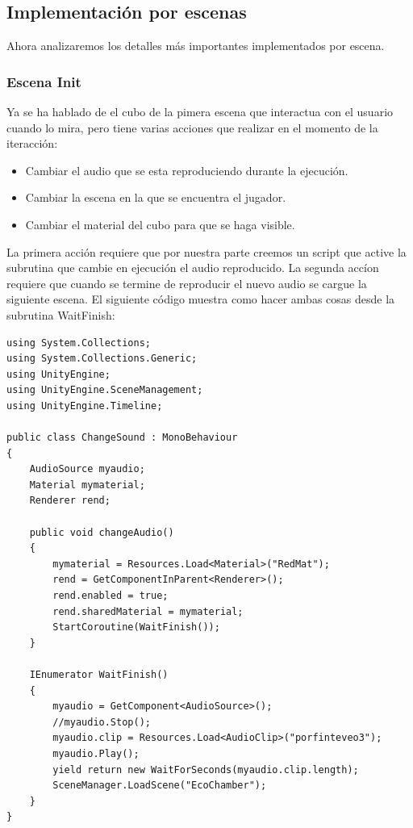 \subsection{Implementación por escenas}

\quad Ahora analizaremos los detalles más importantes implementados por escena.\\
 
	\subsubsection{Escena Init}

\quad Ya se ha hablado de el cubo de la pimera escena que interactua con el usuario cuando lo mira, pero tiene varias acciones que realizar en el momento de la iteracción:

\begin{itemize}
	\item Cambiar el audio que se esta reproduciendo durante la ejecución.
	\item Cambiar la escena en la que se encuentra el jugador.
	\item Cambiar el material del cubo para que se haga visible.
\end{itemize}

\quad La primera acción requiere que por nuestra parte creemos un script que active la subrutina que cambie en ejecución el audio reproducido. La segunda accíon requiere que cuando se termine de reproducir el nuevo audio se cargue la siguiente escena. El siguiente código muestra como hacer ambas cosas desde la subrutina WaitFinish:\\

\lstset{language=[sharp]C, breaklines=true, basicstyle=\footnotesize}
\begin{lstlisting}[frame=single, caption={ChangeSound.cs}]
using System.Collections;
using System.Collections.Generic;
using UnityEngine;
using UnityEngine.SceneManagement;
using UnityEngine.Timeline;

public class ChangeSound : MonoBehaviour
{
    AudioSource myaudio;
    Material mymaterial;
    Renderer rend;

    public void changeAudio()
    {
        mymaterial = Resources.Load<Material>("RedMat");
        rend = GetComponentInParent<Renderer>();
        rend.enabled = true;
        rend.sharedMaterial = mymaterial;
        StartCoroutine(WaitFinish());
    }

    IEnumerator WaitFinish()
    {
        myaudio = GetComponent<AudioSource>();
        //myaudio.Stop();
        myaudio.clip = Resources.Load<AudioClip>("porfinteveo3");
        myaudio.Play();
        yield return new WaitForSeconds(myaudio.clip.length);
        SceneManager.LoadScene("EcoChamber");
    }
}

\end{lstlisting}

